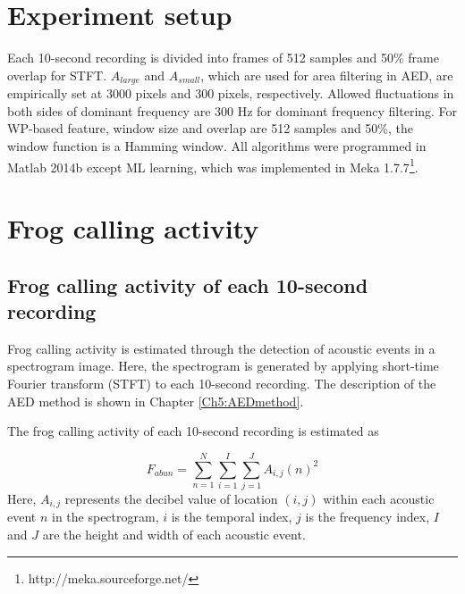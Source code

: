 \section{Experiment setup}
Each 10-second recording is divided into frames of 512 samples and 50\% frame overlap for STFT. $A_{large}$ and $A_{small}$, which are used for area filtering in AED, are empirically set at 3000 pixels and 300 pixels, respectively. Allowed fluctuations in both sides of dominant frequency are 300 Hz for dominant frequency filtering. For WP-based feature, window size and overlap are 512 samples and 50\%, the window function is a Hamming window. All algorithms were programmed in Matlab 2014b except ML learning, which was implemented in Meka 1.7.7\footnote[4]{http://meka.sourceforge.net/}. 




\section{Frog calling activity}

\subsection{Frog calling activity of each 10-second recording}
Frog calling activity is estimated through the detection of acoustic events in a spectrogram image. Here, the spectrogram is generated by applying short-time Fourier transform (STFT) to each 10-second recording. The description of the AED method is shown in Chapter \ref{Ch5:AEDmethod}.



The frog calling activity of each 10-second recording is estimated as 

\begin{equation}
F_{abun} = \sum_{n=1}^{N}\sum_{i=1}^{I}\sum_{j=1}^{J} A_{i,j}(n)^2
\end{equation}
Here, $A_{i,j}$ represents the decibel value of location $(i,j)$ within each acoustic event $n$ in the spectrogram, $i$ is the temporal index, $j$ is the frequency index, $I$ and $J$ are the height and width of each acoustic event.

